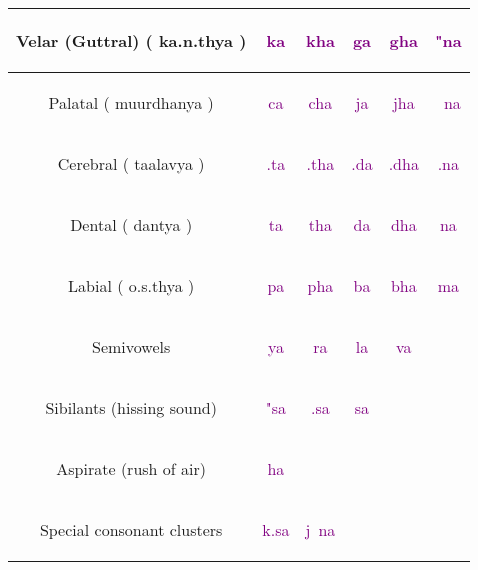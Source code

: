 \documentclass[a4paper, 12pt]{article}
\newcommand \sansletter[1]{
    \fontsize{2cm}{2.4cm}\selectfont
    \sans{#1}
}
\newcommand \sans[1]{
    \textsanskrit{#1}
}
\newcommand \sansconsonant[1]{
    \textcolor{purple} {
    \fontsize{1cm}{1.2cm}\selectfont
    \sans{#1}
    }
}
\begin{document}
\begin{center}
\begin{tabular}{|c|c|c|c|c|c|}
\hline
    Velar (Guttral) (\sans{ka.n.thya}) &
    \sansconsonant{ka} &
    \sansconsonant{kha} &
    \sansconsonant{ga} &
    \sansconsonant{gha} &
    \sansconsonant{"na} \\
    \hline
    Palatal (\sans{muurdhanya}) &
    \sansconsonant{ca} &
    \sansconsonant{cha} &
    \sansconsonant{ja} &
    \sansconsonant{jha} &
    \sansconsonant{~na} \\
    \hline
    Cerebral (\sans{taalavya}) &
    \sansconsonant{.ta} &
    \sansconsonant{.tha} &
    \sansconsonant{.da} &
    \sansconsonant{.dha} &
    \sansconsonant{.na} \\
    \hline
    Dental (\sans{dantya}) &
    \sansconsonant{ta} &
    \sansconsonant{tha} &
    \sansconsonant{da} &
    \sansconsonant{dha} &
    \sansconsonant{na} \\
    \hline
    Labial (\sans{o.s.thya}) &
    \sansconsonant{pa} &
    \sansconsonant{pha} &
    \sansconsonant{ba} &
    \sansconsonant{bha} &
    \sansconsonant{ma} \\
    \hline
    Semivowels &
    \sansconsonant{ya} &
    \sansconsonant{ra} &
    \sansconsonant{la} &
    \sansconsonant{va} \\
    \hline
    Sibilants (hissing sound) &
    \sansconsonant{"sa} &
    \sansconsonant{.sa} &
    \sansconsonant{sa} \\
    \hline
    Aspirate (rush of air) &
    \sansconsonant{ha} \\
    \hline
    Special consonant clusters &
    \sansconsonant{k.sa} &
    \sansconsonant{j~na}  \\
    \hline
\hline
\end{tabular}
\end{center}
\end{document}
